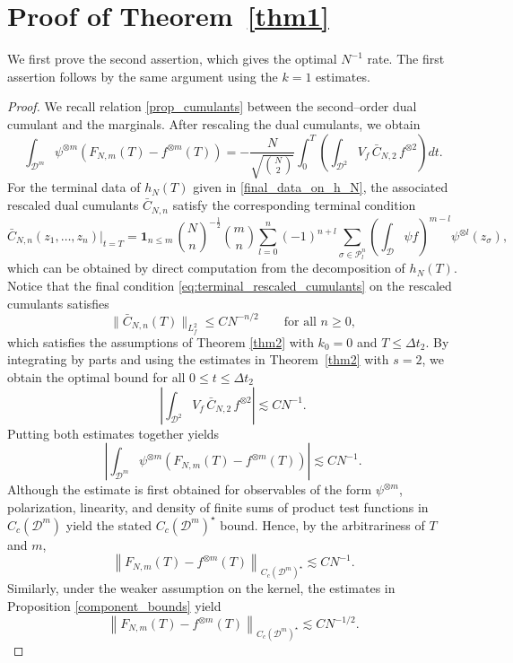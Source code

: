 \documentclass[pdflatex,sn-mathphys-num]{sn-jnl}
\theoremstyle{thmstyleone}%
\theoremstyle{thmstyletwo}%
\theoremstyle{thmstylethree}%
\begin{document}
\section{Proof of Theorem~\ref{thm1}}
We first prove the second assertion, which gives the optimal \(N^{-1}\) rate. The first assertion follows by the same argument using the \(k=1\) estimates.
\begin{proof} 
We recall relation \eqref{prop_cumulants} between the second--order dual cumulant and the marginals. After rescaling the dual cumulants, we obtain
\[
\int_{\mathcal D^m}\psi^{\otimes m}
\left(F_{N,m}(T)-f^{\otimes m}(T)\right)=
-\frac{N}{\sqrt{\binom{N}{2}}}
\int_0^T
\left(
\int_{\mathcal D^2}
V_f\,\bar C_{N,2}\,f^{\otimes2}
\right)dt.
\]
For the terminal data of $h_N(T)$ given in \eqref{final_data_on_h_N}, the associated rescaled dual cumulants $\bar C_{N,n}$ satisfy the corresponding terminal condition
\begin{equation}\label{eq:terminal_rescaled_cumulants}
\bar C_{N,n}(z_1,\dots,z_n)\big|_{t=T}
=
\mathbf{1}_{n\le m}\,{N\choose n}^{-\frac12}{m\choose n}
\sum_{l=0}^{n}(-1)^{n+l}\sum_{\sigma\in\mathcal P_l^n}
\left(\int_{\mathcal D}\psi f\right)^{m-l}\psi^{\otimes l}(z_\sigma),
\end{equation}
which can be obtained by direct computation from the decomposition of $h_N(T)$. Notice that the final condition \eqref{eq:terminal_rescaled_cumulants} on the rescaled cumulants satisfies
\[\|\bar{C}_{N,n}(T) \|_{L^2_f} \leq C N^{-n/2} \qquad \text{for all } n \geq 0,\]
which satisfies the assumptions of Theorem \ref{thm2} with $k_0=0$ and $T\leq \Delta t_2$. By integrating by parts and using the estimates in Theorem~\ref{thm2} with \(s=2\), we obtain the optimal bound for all $ 0 \leq t \leq \Delta t_2$
\[
\left| \int_{\mathcal{D}^2} V_f\, \bar{C}_{N,2}\, f^{\otimes 2} \right|\lesssim  C N^{-1} .
\]
Putting both estimates together yields 
\[
\left| \int_{\mathcal{D}^m} \psi^{\otimes m} 
\left( F_{N,m}(T) - f^{\otimes m}(T) \right) \right|
\lesssim C N^{-1}.
\]
Although the estimate is first obtained for observables of the
form \(\psi^{\otimes m}\), polarization, linearity, and density of finite sums of product test functions in \(C_c(\mathcal{D}^m)\) yield the stated
\(C_c(\mathcal{D}^m)^\star\) bound. Hence, by the arbitrariness of \(T\) and \(m\),
\[
\left\| F_{N,m}(T)-f^{\otimes m}(T)\right\|_{C_c(\mathcal{D}^m)^\star}
\lesssim C N^{-1}.
\]
Similarly, under the weaker assumption on the kernel, the estimates in Proposition \ref{component_bounds} yield 
\[
\left\| F_{N,m}(T) - f^{\otimes m}(T) \right\|_{C_c(\mathcal{D}^m)^\star}
\lesssim C N^{-1/2}.
\]
\end{proof}
\end{document}
